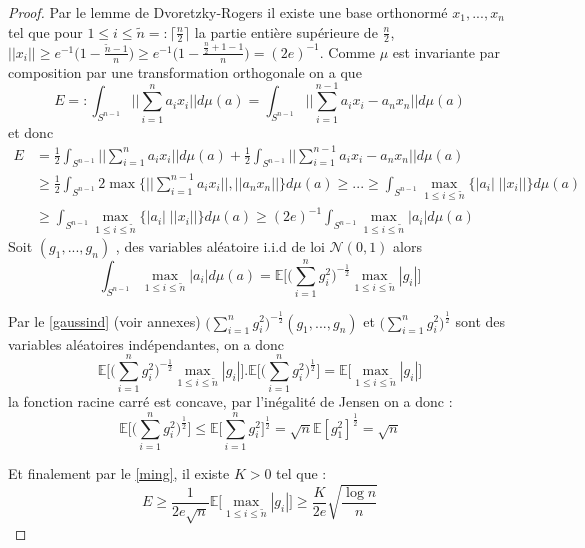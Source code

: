 \documentclass[12pt]{article}
\theoremstyle{definition}
\begin{document}
\begin{proof}
	Par le lemme de Dvoretzky-Rogers il existe une base orthonormé $x_1,...,x_n$ tel que pour $1\leq i \leq \tilde{n}=:\big\lceil\frac{n}{2}\big\rceil$ la partie entière supérieure de $\frac{n}{2}$, $||x_i||\geq e^{-1}\Big(1-\frac{\tilde{n} -1}{n}\Big)\geq e^{-1}\Big(1-\frac{\frac{n}{2}+1 -1}{n}\Big)= (2e)^{-1}$. Comme $\mu$ est invariante par composition par une transformation orthogonale on a que  
	\begin{equation*}
	E=:\int_{S^{n-1}} ||\sum_{i=1}^{n}a_ix_i||d\mu(a)= \int_{S^{n-1}} ||\sum_{i=1}^{n-1}a_ix_i-a_nx_n||d\mu(a)
	\end{equation*}
	et donc 
	\begin{align*}
	E&=\frac{1}{2}\int_{S^{n-1}} ||\sum_{i=1}^{n}a_ix_i||d\mu(a)+ \frac{1}{2}\int_{S^{n-1}} ||\sum_{i=1}^{n-1}a_ix_i-a_nx_n||d\mu(a)\\
	&\geq\frac{1}{2}\int_{S^{n-1}} 2\max\Big\{||\sum_{i=1}^{n-1}a_ix_i||,||a_nx_n||\Big\}d\mu(a)\geq ...\geq \int_{S^{n-1}} \max_{1\leq i \leq \tilde{n}}\Big\{|a_i|\;||x_i||\Big\}d\mu(a)\\
	&\geq \int_{S^{n-1}} \max_{1\leq i \leq \tilde{n}}\Big\{|a_i|\;||x_i||\Big\}d\mu(a) \geq (2e)^{-1}\int_{S^{n-1}} \max_{1\leq i \leq \tilde{n}}|a_i| d\mu(a)	
	\end{align*}
	Soit $(g_1,...,g_n)$ , des variables aléatoire i.i.d de loi $\mathcal{N}(0,1)$ alors 
	\begin{equation*}
	\int_{S^{n-1}} \max_{1\leq i \leq \tilde{n}}|a_i| d\mu(a) =\mathbb{E}\Big[\big(\sum_{i=1}^{n}g_i^2\big)^{-\frac{1}{2}} \max_{1\leq i \leq \tilde{n}}|g_i|\Big]
	\end{equation*}
	
	Par le \cref{gaussind} (voir annexes) $\big(\sum_{i=1}^{n}g_i^2\big)^{-\frac{1}{2}}(g_1,...,g_n)$ et $(\sum_{i=1}^{n}g_i^2\big)^{\frac{1}{2}}$ sont des variables aléatoires indépendantes, on a donc 
	\begin{equation*}
	\mathbb{E}\Big[\big(\sum_{i=1}^{n}g_i^2\big)^{-\frac{1}{2}} \max_{1\leq i \leq \tilde{n}}|g_i|\Big] . \mathbb{E}\Big[\big(\sum_{i=1}^{n}g_i^2\big)^{\frac{1}{2}}\Big] = \mathbb{E}\big[\max_{1\leq i \leq \tilde{n}}|g_i|\big]
	\end{equation*}
	la fonction racine carré est concave, par l'inégalité de Jensen on a donc :
	\begin{equation*}
	\mathbb{E}\big[\big(\sum_{i=1}^{n}g_i^2\big)^{\frac{1}{2}}\big]\leq \mathbb{E}\big[\sum_{i=1}^{n}g_i^2\big]^{\frac{1}{2}}= \sqrt{n} \mathbb{E}[g_1^2]^{\frac{1}{2}}=\sqrt{n} 
	\end{equation*}
	
	Et finalement par le \cref{ming}, il existe $K>0$ tel que :
	\begin{equation*}
	E\geq \frac{1}{2e\sqrt{n}} \mathbb{E}\big[\max_{1\leq i \leq \tilde{n}}|g_i|\big]\geq \frac{K}{2e}\sqrt{\frac{\log n}{n}}
	\end{equation*}
\end{proof}
\end{document}
